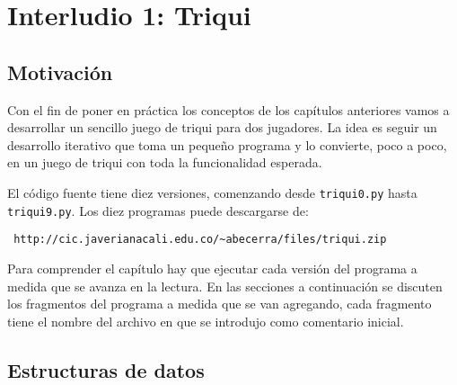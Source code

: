 


\chapter{Interludio 1: Triqui}
\label{cap:inter1:triqui}



\section{Motivación}

Con el fin de poner en práctica los conceptos de los capítulos anteriores
vamos a desarrollar un sencillo juego de triqui para dos jugadores. La idea
es seguir un desarrollo iterativo que toma un pequeño programa y lo convierte,
poco a poco, en un juego de triqui con toda la funcionalidad esperada.

El código fuente tiene diez versiones, comenzando desde \texttt{triqui0.py} hasta
\texttt{triqui9.py}. Los diez programas puede descargarse de:

\begin{verbatim}
 http://cic.javerianacali.edu.co/~abecerra/files/triqui.zip
\end{verbatim}

Para comprender el capítulo hay que ejecutar cada versión del programa a 
medida que se avanza en la lectura. En las secciones a continuación se discuten 
los fragmentos del programa a medida que se van agregando, cada fragmento tiene 
el nombre del archivo en que se introdujo como comentario inicial.

\section{Estructuras de datos}

